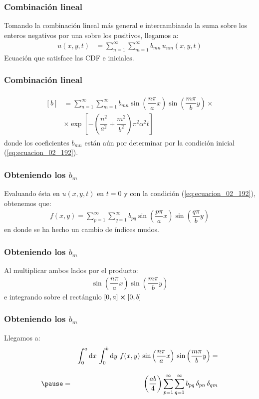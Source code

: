 \documentclass[12pt]{beamer}
\begin{document}
\begin{frame}
\frametitle{Combinación lineal}
Tomando la combinación lineal más general e intercambiando la suma sobre los enteros negativos por una sobre los positivos, llegamos a:
\begin{align}
u(x, y, t) &= \sum_{n=1}^{\infty} \sum_{m=1}^{\infty} b_{mn} \, u_{nm} (x, y, t) \label{eq:ecuacion_02_207}
\end{align}
Ecuación que satisface las CDF e iniciales.
\end{frame}
\begin{frame}
\frametitle{Combinación lineal}
\begin{align}
\begin{aligned}[b]
&= \sum_{n=1}^{\infty} \sum_{m=1}^{\infty} b_{mn} \sin \left( \dfrac{n \pi}{a} x \right) \sin \left( \dfrac{m \pi}{b} y \right) \times \\[1em]
&\times \exp\left[ - \left( \dfrac{n^{2}}{a^{2}} {+} \dfrac{m^{2}}{b^{2}} \right) \pi^{2} \alpha^{2} t \right] \label{eq:ecuacion_02_208}
\end{aligned}
\end{align}
donde los coeficientes $b_{mn}$ están aún por determinar por la condición inicial (\ref{eq:ecuacion_02_192}).
\end{frame}
\begin{frame}
\frametitle{Obteniendo los $b_{m}$}
Evaluando ésta en $u(x, y, t)$ en $t = 0$ y con la condición (\ref{eq:ecuacion_02_192}), obtenemos que:
\begin{align}
f(x,y) = \sum_{p=1}^{\infty} \sum_{q=1}^{\infty} b_{pq} \sin \left( \dfrac{p \pi}{a} x \right) \sin \left( \dfrac{q \pi}{b} y \right) 
\end{align}
en donde se ha hecho un cambio de índices mudos.
\end{frame}
\begin{frame}
\frametitle{Obteniendo los $b_{m}$}
Al multiplicar ambos lados por el producto:
\begin{align*}
\sin \left( \dfrac{n \pi}{a} x \right) \sin \left( \dfrac{m \pi}{b} y \right) 
\end{align*}
e integrando sobre el rectángulo $[0, a] \cp [0, b]$
\end{frame}
\begin{frame}
\frametitle{Obteniendo los $b_{m}$}
Llegamos a:
\begin{eqnarray}
&{}& \int_{0}^{a} \dd{x} \, \int_{0}^{b} \dd{y} \, f(x, y) \, \sin \left( \dfrac{n \pi}{a} x \right) \, \sin \left( \dfrac{m \pi}{b} y \right) = \nonumber \\[1em] \pause
&=& \left( \dfrac{a b}{4} \right) \sum_{p=1}^{\infty} \sum_{q=1}^{\infty} b_{pq} \, \delta_{pn}  \, \delta_{qm}
\label{eq:ecuacion_02_210}
\end{eqnarray}
\end{frame}
\end{document}
